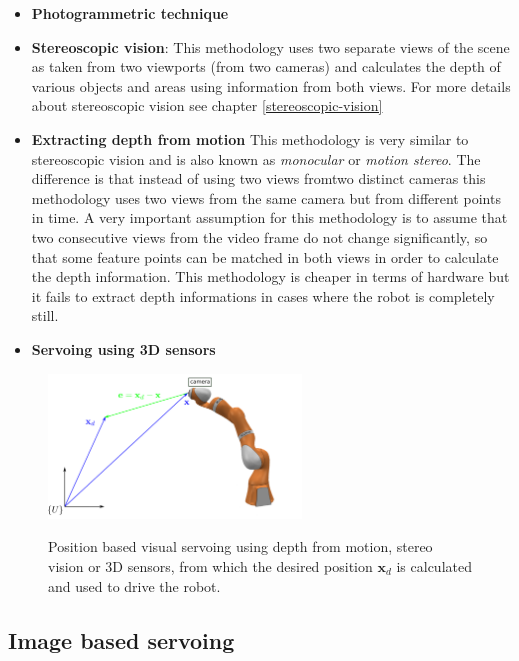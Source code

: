 \begin{itemize}
\item \textbf{Photogrammetric technique}
\item \textbf{Stereoscopic vision}: This methodology uses two separate views of the scene as taken from two viewports (from two cameras) 
and calculates the depth of various objects and areas using information from both views. For more details about stereoscopic vision see chapter \ref{stereoscopic-vision}
\item \textbf{Extracting depth from motion} This methodology is very similar to stereoscopic vision and is also known as \textit{monocular} or \textit{motion stereo}. The difference is that instead of using two views fromtwo distinct cameras this methodology 
uses two views from the same camera but from different points in time. A very important assumption for this methodology is to assume that two consecutive views from the video frame do not change significantly, so that some feature points can be matched in both views in order to calculate the depth information. This methodology 
is cheaper in terms of hardware but it fails to extract depth informations in cases where the robot is completely still.
\item \textbf{Servoing using 3D sensors}
\end{itemize}

\begin{center}
\begin{figure}[!htb]
\centering
\includegraphics[width=0.6\textwidth]{images/visual-servoing-position-based2.png}\\
\caption{Position based visual servoing using depth from motion, stereo vision or 3D sensors, from which the desired position $\mathbf{x}_d$ is calculated and 
used to drive the robot.}
\end{figure}
\end{center}

\subsection{Image based servoing}

